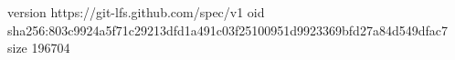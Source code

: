 version https://git-lfs.github.com/spec/v1
oid sha256:803c9924a5f71c29213dfd1a491c03f25100951d9923369bfd27a84d549dfac7
size 196704
